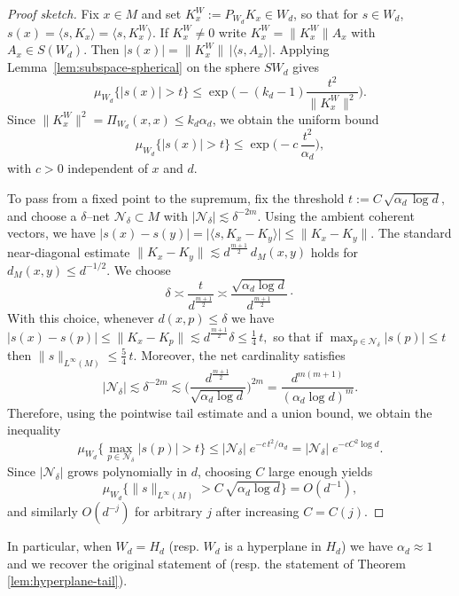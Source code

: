 \documentclass [11pt]{amsart}
\theoremstyle{remark}
\numberwithin{equation}{section}
\numberwithin{theorem}{section}
\begin{document}
\begin{proof}[Proof sketch]
Fix $x\in M$ and set $K_x^W:=P_{W_d}K_x\in W_d$, so that for $s\in W_d$,
\(
s(x)=\langle s,K_x\rangle=\langle s,K_x^W\rangle.
\)
If $K_x^W\neq 0$ write $K_x^W=\|K_x^W\|A_x$ with $A_x\in S(W_d)$.
Then
\(
|s(x)|=\|K_x^W\|\,|\langle s,A_x\rangle|.
\)
Applying Lemma~\ref{lem:subspace-spherical} on the sphere $SW_d$ gives
\[
\mu_{W_d}\{|s(x)|>t\}\le 
\exp\!\Big(-(k_d-1)\frac{t^2}{\|K_x^W\|^2}\Big).
\]
Since $\|K_x^W\|^2=\Pi_{W_d}(x,x)\le k_d\alpha_d$, we obtain the uniform bound
\[
\mu_{W_d}\{|s(x)|>t\}
\le
\exp\!\Big(-c\,\frac{t^2}{\alpha_d}\Big),
\]
with $c>0$ independent of $x$ and $d$.

\smallskip
To pass from a fixed point to the supremum, fix the threshold
\(\displaystyle{
t:= C\,\sqrt{\alpha_d\,\log d},}
\)
and choose a $\delta$--net $\mathcal{N}_\delta\subset M$ with
$|\mathcal{N}_\delta|\lesssim \delta^{-2m}$.
Using the ambient coherent vectors, we have
\(\displaystyle{
|s(x)-s(y)|
=\big|\langle s,K_x-K_y\rangle\big|
\le \|K_x-K_y\|
}\). The standard near-diagonal estimate
$
\|K_x-K_y\|\lesssim d^{\frac{m+1}{2}}\,d_{M}(x,y)$
holds for $d_{M}(x,y)\le d^{-1/2}$. 
We choose
\[
\delta \asymp \frac{t}{d^{\frac{m+1}{2}}}
\asymp \frac{\sqrt{\alpha_d\log d}}{d^{\frac{m+1}{2}}}\cdot
\]
With this choice, whenever $d(x,p)\le\delta$ we have
\(\displaystyle{
|s(x)-s(p)|
\le \|K_x-K_p\|
\lesssim d^{\frac{m+1}{2}}\delta
\le \frac14\,t,
}\)
so that if $\max_{p\in\mathcal{N}_\delta}|s(p)|\le t$ then
\(\displaystyle{
\|s\|_{L^\infty(M)}\le \frac54\,t.}
\)
Moreover, the net cardinality satisfies
\[
|\mathcal{N}_\delta|
\lesssim \delta^{-2m}
\lesssim
\Big(\frac{d^{\frac{m+1}{2}}}{\sqrt{\alpha_d\log d}}\Big)^{2m}
=
\frac{d^{m(m+1)}}{(\alpha_d\log d)^m}.
\]
Therefore, using the pointwise tail estimate and a union bound, we obtain the inequality
\[
\mu_{W_d}\Big\{\max_{p\in\mathcal{N}_\delta}|s(p)|>t\Big\}
\le
|\mathcal{N}_\delta|\;e^{-c\,t^2/\alpha_d}
=
|\mathcal{N}_\delta|\;e^{-cC^2\log d}.
\]
Since $|\mathcal{N}_\delta|$ grows polynomially in $d$, choosing $C$ large enough yields
\[
\mu_{W_d}\Big\{\|s\|_{L^\infty(M)}>C\,\sqrt{\alpha_d\log d}\Big\}
=O(d^{-1}),
\]
and similarly $O(d^{-j})$ for arbitrary $j$ after increasing $C=C(j)$.
\end{proof}

In particular, when $W_d=H_d$ (resp. $W_{d}$ is a hyperplane in $H_{d}$) we have $\alpha_d \approx1$ and we recover the original statement of \cite{SZ} (resp. the statement of Theorem \ref{lem:hyperplane-tail}).
\end{document}
